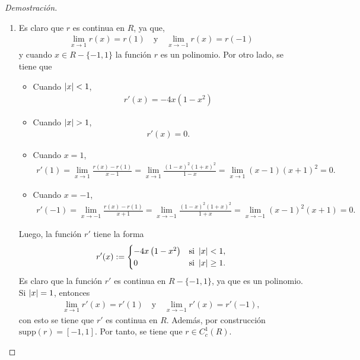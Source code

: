 \documentclass[10pt,a4paper]{report}
\newcommand{\abs}[2][y]{\if#1y\left\fi\lvert#2\if#1y\right\fi\rvert}
\theoremstyle{definition}
\renewcommand{\theproblem}{\Alph{problem}}
\numberwithin{equation}{problem}
\providecommand{\abs}[1]{\left\lvert#1\right\rvert}
\begin{document}
    \begin{proof}[\textcolor{rojo}{Demostración}]
    	\begin{enumerate}[label=\textbf{\theproblem.\arabic{*}.},ref=\theproblem.\arabic{*},parsep=1ex]
    		\item Es claro que $r$ es continua en $R$, ya que,
    		\begin{align*}
    			\lim_{x\to 1}r(x) = r(1)\quad \text{y}\quad \lim_{x\to -1}r(x) = r(-1)
    		\end{align*}
    	    y cuando $x\in R-\{-1,1\}$ la función $r$ es un polinomio. Por otro lado, se tiene que 
    	    \begin{itemize}
    	    	\item Cuando $\abs{x}<1$,
    	    	\begin{align*}
    	    		r'(x) = -4x(1-x^2)
    	    	\end{align*}
        	    \item Cuando $\abs{x}>1$,
        	    \begin{align*}
        	    	r'(x) = 0.
        	    \end{align*}
                \item Cuando $x=1$,
                \begin{align*}
                	r'(1) = \lim_{x\to 1} \frac{r(x)-r(1)}{x-1} = \lim_{x\to 1}\frac{(1-x)^{2}(1+x)^{2}}{1-x} = \lim_{x\to 1} (x-1)(x+1)^{2} = 0.
                \end{align*}
                \item Cuando $x=-1$,
                \begin{align*}
                	r'(-1) = \lim_{x\to -1} \frac{r(x)-r(1)}{x+1} = \lim_{x\to -1}\frac{(1-x)^{2}(1+x)^{2}}{1+x} = \lim_{x\to -1} (x-1)^{2}(x+1) = 0.
                \end{align*}
    	    \end{itemize}
             Luego, la función $r'$ tiene la forma
             \begin{align*}
             	r'(x) := \begin{cases}
             		-4x\left(1-x^{2}\right) & \text{si } \abs{x}<1,\\
             		0 & \text{si } \abs{x} \geq 1.
             	\end{cases}
             \end{align*}
             Es claro que la función $r'$ es continua en $R-\{-1,1\}$, ya que es un polinomio. Si $\abs{x} = 1$, entonces
             \begin{align*}
             	\lim_{x\to 1} r'(x) = r'(1) \quad \text{y}\quad \lim_{x\to -1}r'(x) = r'(-1),
             \end{align*}
              con esto se tiene que $r'$ es continua en $R$. Además, por construcción $\text{supp}(r) = [-1,1]$. Por tanto, se tiene que  $r\in C^{1}_{c}(R)$.\hspace{0.2cm}
              

\end{enumerate}
\end{proof}
\end{document}

